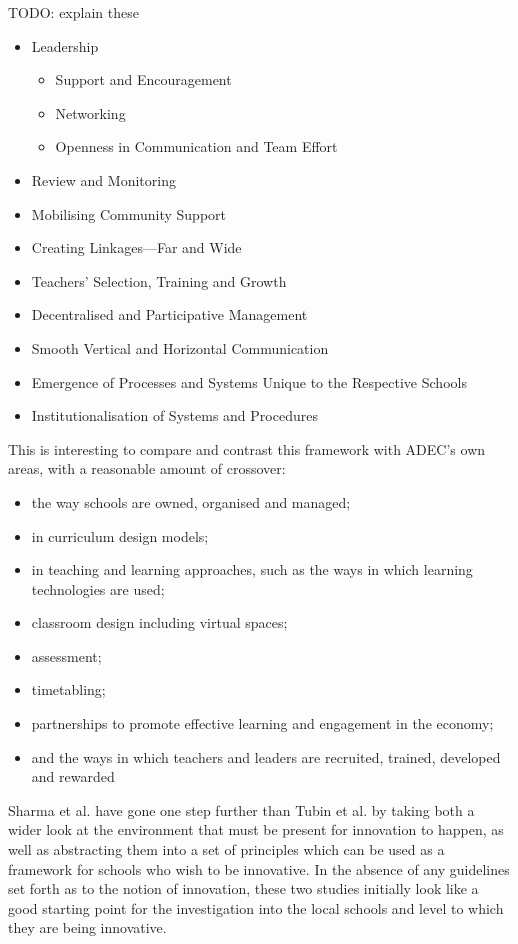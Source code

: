 TODO: explain these
\begin{itemize}
\item Leadership
    \begin{itemize}
    \item Support and Encouragement
    \item Networking
    \item Openness in Communication and Team Effort
    \end{itemize}
\item Review and Monitoring
\item Mobilising Community Support
\item Creating Linkages—Far and Wide
\item Teachers’ Selection, Training and Growth
\item Decentralised and Participative Management
\item Smooth Vertical and Horizontal Communication
\item Emergence of Processes and Systems Unique to the Respective Schools
\item Institutionalisation of Systems and Procedures
\end{itemize}

This is interesting to compare and contrast this framework with ADEC's own areas, with a reasonable amount of crossover:

\begin{itemize}
\item the way schools are owned, organised and managed; 
\item in curriculum design models; 
\item in teaching and learning approaches, such as the ways in which learning technologies are used; 
\item classroom design including virtual spaces; 
\item assessment; 
\item timetabling; 
\item partnerships to promote effective learning and engagement in the economy; 
\item and the ways in which teachers and leaders are recruited, trained, developed and rewarded
\end{itemize}

Sharma et al. have gone one step further than Tubin et al. by taking both a wider look at the environment that must be present for innovation to happen, as well as abstracting them into a set of principles which can be used as a framework for schools who wish to be innovative. In the absence of any guidelines set forth as to the notion of innovation, these two studies initially look like a good starting point for the investigation into the local schools and level to which they are being innovative.

